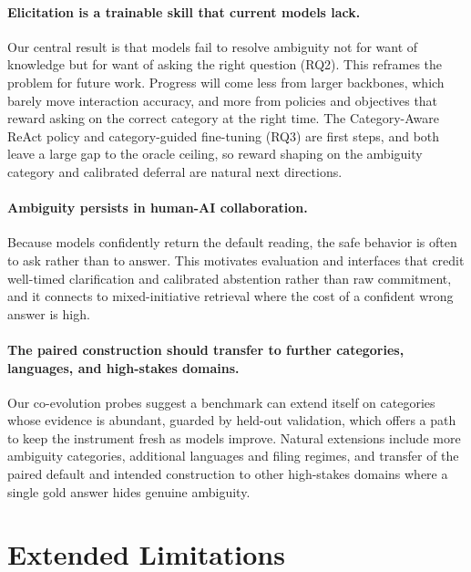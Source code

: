 \paragraph{Elicitation is a trainable skill that current models lack.} Our central result
is that models fail to resolve ambiguity not for want of knowledge but for want of asking
the right question (RQ2). This reframes the problem for future work. Progress will come less
from larger backbones, which barely move interaction accuracy, and more from policies and
objectives that reward asking on the correct category at the right time. The Category-Aware ReAct
policy and category-guided fine-tuning (RQ3) are first steps, and both leave a large gap to the
oracle ceiling, so reward shaping on the ambiguity category and calibrated deferral are natural
next directions.

\paragraph{Ambiguity persists in human-AI collaboration.} Because models confidently return
the default reading, the safe behavior is often to ask rather than to answer. This motivates
evaluation and interfaces that credit well-timed clarification and calibrated abstention
rather than raw commitment, and it connects to mixed-initiative retrieval where the cost of
a confident wrong answer is high.

\paragraph{The paired construction should transfer to further categories, languages, and high-stakes domains.} Our co-evolution probes suggest a
benchmark can extend itself on categories whose evidence is abundant, guarded by held-out
validation, which offers a path to keep the instrument fresh as models improve. Natural
extensions include more ambiguity categories, additional languages and filing regimes, and
transfer of the paired default and intended construction to other high-stakes domains where
a single gold answer hides genuine ambiguity.



\section{Extended Limitations}
\label{app:limitations}

